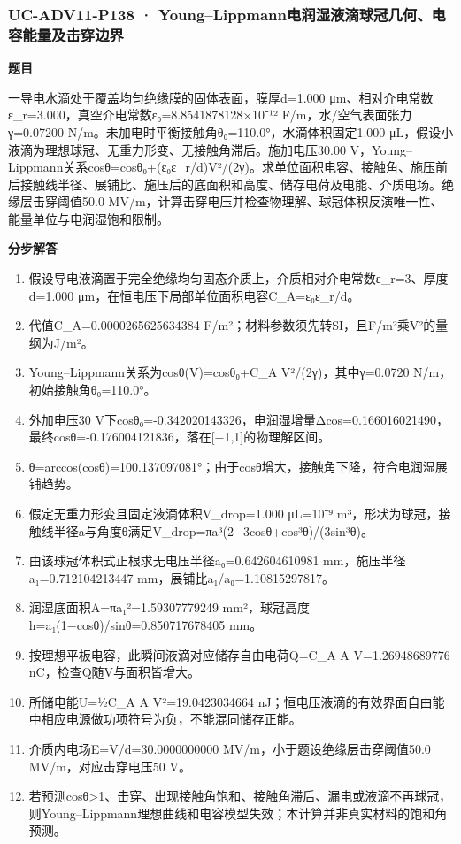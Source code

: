 \documentclass[UTF8,11pt,a4paper]{ctexart}
\begin{document}
\subsubsection*{UC-ADV11-P138 · Young–Lippmann电润湿液滴球冠几何、电容能量及击穿边界}
\noindent\textbf{题目}\par
一导电水滴处于覆盖均匀绝缘膜的固体表面，膜厚d=1.000 μm、相对介电常数ε\_r=3.000，真空介电常数ε₀=8.8541878128×10⁻¹² F/m，水/空气表面张力γ=0.07200 N/m。未加电时平衡接触角θ₀=110.0°，水滴体积固定1.000 μL，假设小液滴为理想球冠、无重力形变、无接触角滞后。施加电压30.00 V，Young–Lippmann关系cosθ=cosθ₀+(ε₀ε\_r/d)V²/(2γ)。求单位面积电容、接触角、施压前后接触线半径、展铺比、施压后的底面积和高度、储存电荷及电能、介质电场。绝缘层击穿阈值50.0 MV/m，计算击穿电压并检查物理解、球冠体积反演唯一性、能量单位与电润湿饱和限制。\par
\medskip\noindent\textbf{分步解答}
\begin{enumerate}
\item 假设导电液滴置于完全绝缘均匀固态介质上，介质相对介电常数ε\_r=3、厚度d=1.000 μm，在恒电压下局部单位面积电容C\_A=ε₀ε\_r/d。
\item 代值C\_A=0.0000265625634384 F/m²；材料参数须先转SI，且F/m²乘V²的量纲为J/m²。
\item Young–Lippmann关系为cosθ(V)=cosθ₀+C\_A V²/(2γ)，其中γ=0.0720 N/m，初始接触角θ₀=110.0°。
\item 外加电压30 V下cosθ₀=-0.342020143326，电润湿增量Δcos=0.166016021490，最终cosθ=-0.176004121836，落在[−1,1]的物理解区间。
\item θ=arccos(cosθ)=100.137097081°；由于cosθ增大，接触角下降，符合电润湿展铺趋势。
\item 假定无重力形变且固定液滴体积V\_drop=1.000 μL=10⁻⁹ m³，形状为球冠，接触线半径a与角度θ满足V\_drop=πa³(2−3cosθ+cos³θ)/(3sin³θ)。
\item 由该球冠体积式正根求无电压半径a₀=0.642604610981 mm，施压半径a₁=0.712104213447 mm，展铺比a₁/a₀=1.10815297817。
\item 润湿底面积A=πa₁²=1.59307779249 mm²，球冠高度h=a₁(1−cosθ)/sinθ=0.850717678405 mm。
\item 按理想平板电容，此瞬间液滴对应储存自由电荷Q=C\_A A V=1.26948689776 nC，检查Q随V与面积皆增大。
\item 所储电能U=½C\_A A V²=19.0423034664 nJ；恒电压液滴的有效界面自由能中相应电源做功项符号为负，不能混同储存正能。
\item 介质内电场E=V/d=30.0000000000 MV/m，小于题设绝缘层击穿阈值50.0 MV/m，对应击穿电压50 V。
\item 若预测cosθ>1、击穿、出现接触角饱和、接触角滞后、漏电或液滴不再球冠，则Young–Lippmann理想曲线和电容模型失效；本计算并非真实材料的饱和角预测。
\end{enumerate}
\end{document}
